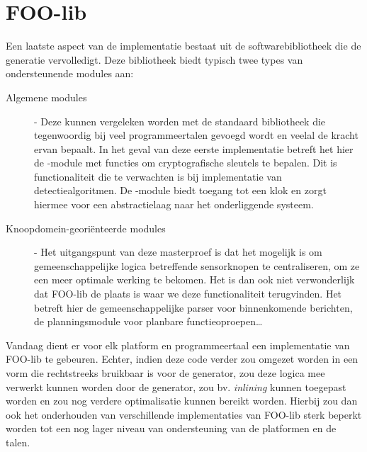 
\section{FOO-lib}
\label{section:devel-foo-lib}

Een laatste aspect van de implementatie bestaat uit de softwarebibliotheek die
de generatie vervolledigt. Deze bibliotheek biedt typisch twee types van
ondersteunende modules aan:

\begin{description}

\item[Algemene modules] - Deze kunnen vergeleken worden met de standaard
bibliotheek die tegenwoordig bij veel programmeertalen gevoegd wordt en veelal
de kracht ervan bepaalt. In het geval van deze eerste implementatie betreft het
hier de -module met functies om cryptografische sleutels te
bepalen. Dit is functionaliteit die te verwachten is bij implementatie van
detectiealgoritmen. De -module biedt toegang tot een klok en zorgt
hiermee voor een abstractielaag naar het onderliggende systeem.

\item[Knoopdomein-geori\"enteerde modules] - Het uitgangspunt van deze
masterproef is dat het mogelijk is om gemeenschappelijke logica betreffende
sensorknopen te centraliseren, om ze een meer optimale werking te bekomen. Het
is dan ook niet verwonderlijk dat FOO-lib de plaats is waar we deze
functionaliteit terugvinden. Het betreft hier de gemeenschappelijke parser voor
binnenkomende berichten, de planningsmodule voor planbare functieoproepen\dots

\end{description}

Vandaag dient er voor elk platform en programmeertaal een implementatie van
FOO-lib te gebeuren. Echter, indien deze code verder zou omgezet worden in een
vorm die rechtstreeks bruikbaar is voor de generator, zou deze logica mee
verwerkt kunnen worden door de generator, zou bv. \emph{inlining} kunnen
toegepast worden en zou nog verdere optimalisatie kunnen bereikt worden.
Hierbij zou dan ook het onderhouden van verschillende implementaties van
FOO-lib sterk beperkt worden tot een nog lager niveau van ondersteuning van de
platformen en de talen.
